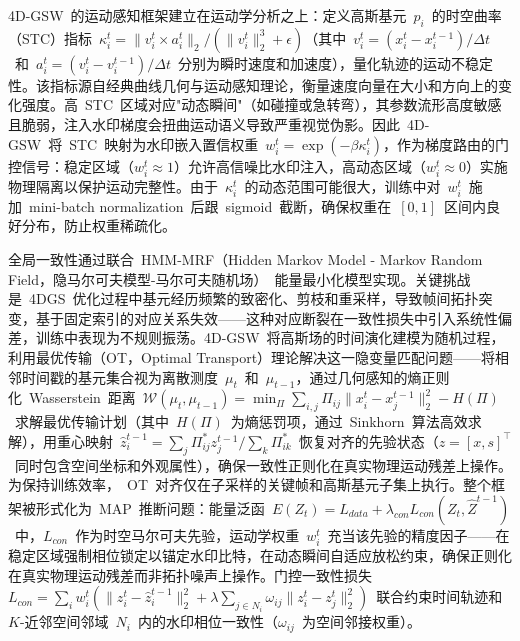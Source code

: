 4D-GSW~的运动感知框架建立在运动学分析之上：定义高斯基元~$p_i$~的时空曲率（STC）指标~$\kappa_i^t = \|v_i^t \times a_i^t\|_2 / (\|v_i^t\|_2^3 + \epsilon)$（其中~$v_i^t = (x_i^t - x_i^{t-1})/\Delta t$~和~$a_i^t = (v_i^t - v_i^{t-1})/\Delta t$~分别为瞬时速度和加速度），量化轨迹的运动不稳定性。该指标源自经典曲线几何与运动感知理论，衡量速度向量在大小和方向上的变化强度。高~STC~区域对应"动态瞬间"（如碰撞或急转弯），其参数流形高度敏感且脆弱，注入水印梯度会扭曲运动语义导致严重视觉伪影。因此~4D-GSW~将~STC~映射为水印嵌入置信权重~$w_i^t = \exp(-\beta \kappa_i^t)$，作为梯度路由的门控信号：稳定区域（$w_i^t \approx 1$）允许高信噪比水印注入，高动态区域（$w_i^t \approx 0$）实施物理隔离以保护运动完整性。由于~$\kappa_i^t$~的动态范围可能很大，训练中对~$w_i^t$~施加~mini-batch normalization~后跟~sigmoid~截断，确保权重在~$[0,1]$~区间内良好分布，防止权重稀疏化。

全局一致性通过联合~HMM-MRF（Hidden Markov Model - Markov Random Field，隐马尔可夫模型-马尔可夫随机场）~能量最小化模型实现。关键挑战是~4DGS~优化过程中基元经历频繁的致密化、剪枝和重采样，导致帧间拓扑突变，基于固定索引的对应关系失效——这种对应断裂在一致性损失中引入系统性偏差，训练中表现为不规则振荡。4D-GSW~将高斯场的时间演化建模为随机过程，利用最优传输（OT，Optimal Transport）理论解决这一隐变量匹配问题——将相邻时间戳的基元集合视为离散测度~$\mu_t$~和~$\mu_{t-1}$，通过几何感知的熵正则化~Wasserstein~距离~$\mathcal{W}(\mu_t, \mu_{t-1}) = \min_{\Pi} \sum_{i,j} \Pi_{ij} \|x_i^t - x_j^{t-1}\|_2^2 - H(\Pi)$~求解最优传输计划（其中~$H(\Pi)$~为熵惩罚项，通过~Sinkhorn~算法高效求解），用重心映射~$\hat{z}_i^{t-1} = \sum_j \Pi_{ij}^* z_j^{t-1} / \sum_k \Pi_{ik}^*$~恢复对齐的先验状态（$z = [x, s]^\top$~同时包含空间坐标和外观属性），确保一致性正则化在真实物理运动残差上操作。为保持训练效率，~OT~对齐仅在子采样的关键帧和高斯基元子集上执行。整个框架被形式化为~MAP~推断问题：能量泛函~$E(Z_t) = L_{data} + \lambda_{con} L_{con}(Z_t, \hat{Z}^{t-1})$~中，$L_{con}$~作为时空马尔可夫先验，运动学权重~$w_i^t$~充当该先验的精度因子——在稳定区域强制相位锁定以锚定水印比特，在动态瞬间自适应放松约束，确保正则化在真实物理运动残差而非拓扑噪声上操作。门控一致性损失~$L_{con} = \sum_i w_i^t (\|z_i^t - \hat{z}_i^{t-1}\|_2^2 + \lambda \sum_{j \in N_i} \omega_{ij} \|z_i^t - z_j^t\|_2^2)$~联合约束时间轨迹和~$K$-近邻空间邻域~$N_i$~内的水印相位一致性（$\omega_{ij}$~为空间邻接权重）。

